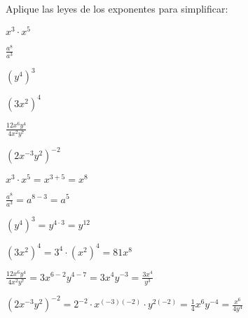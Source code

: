 \begin{exercise}
\problem Aplique las leyes de los exponentes para simplificar:

\begin{exerciselist}
    \item $x^3 \cdot x^5$
    \item $\frac{a^8}{a^3}$
    \item $(y^4)^3$
    \item $(3x^2)^4$
    \item $\frac{12x^6y^4}{4x^2y^7}$
    \item $(2x^{-3}y^2)^{-2}$
\end{exerciselist}

\begin{solucion}
\begin{exerciselist}
    \item $x^3 \cdot x^5 = x^{3+5} = x^8$
    
    \item $\frac{a^8}{a^3} = a^{8-3} = a^5$
    
    \item $(y^4)^3 = y^{4 \cdot 3} = y^{12}$
    
    \item $(3x^2)^4 = 3^4 \cdot (x^2)^4 = 81x^8$
    
    \item $\frac{12x^6y^4}{4x^2y^7} = 3x^{6-2}y^{4-7} = 3x^4y^{-3} = \frac{3x^4}{y^3}$
    
    \item $(2x^{-3}y^2)^{-2} = 2^{-2} \cdot x^{(-3)(-2)} \cdot y^{2(-2)} = \frac{1}{4}x^6y^{-4} = \frac{x^6}{4y^4}$
\end{exerciselist}
\end{solucion}
\end{exercise}

